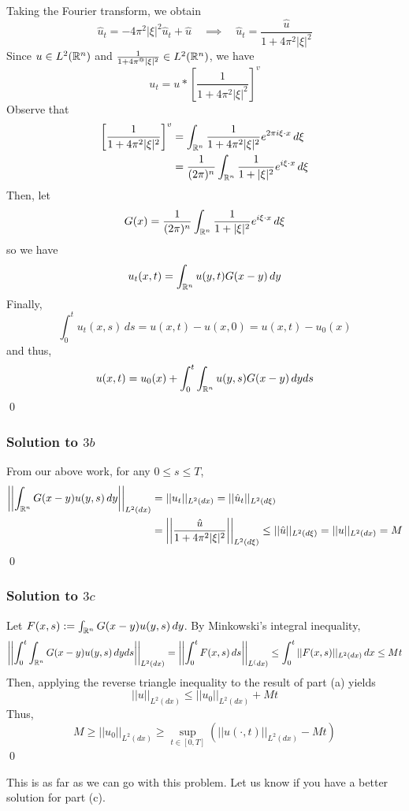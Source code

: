 Taking the Fourier transform, we obtain
$$ \hat{u}_t = -4 \pi^2 |\xi|^2 \hat{u}_t + \hat{u} \quad \implies \quad \hat{u}_t = \frac{\hat{u}}{1 + 4\pi^2|\xi|^2} $$
Since $u \in L^2(\mathbb{R}^n)$ and $\frac{1}{1+4 \pi^@ |\xi|^2} \in L^2(\mathbb{R}^n)$, we have
$$ u_t = u \ast \left[ \frac{1}{1+4 \pi^2 |\xi|^2} \right]^{v} $$
Observe that
\begin{align*}
\left[ \frac{1}{1+4 \pi^2 |\xi|^2} \right]^{v} &= \int_{\mathbb{R}^n} \frac{1}{1+4 \pi^2 |\xi|^2} e^{2 \pi i \xi \cdot x} \, d \xi \\
&= \frac{1}{(2\pi)^n} \int_{\mathbb{R}^n} \frac{1}{1+|\xi|^2} e^{i \xi \cdot x} \, d \xi
\end{align*}
Then, let
$$ G(x) = \frac{1}{(2\pi)^n} \int_{\mathbb{R}^n} \frac{1}{1+|\xi|^2} e^{i \xi \cdot x} \, d \xi $$
so we have
$$ u_t(x,t) = \int_{\mathbb{R}^n} u(y,t) G(x-y) \, dy $$
Finally,
$$ \int_0^t u_t(x,s) \, ds = u(x,t) - u(x,0) = u(x,t) - u_0(x) $$
and thus,
$$ u(x,t) = u_0(x) + \int_0^t \int_{\mathbb{R}^n} u(y,s) G(x-y) \, dy ds $$
\hfill \qed

\subsubsection*{Solution to $3b$}
From our above work, for any $0 \leq s \leq T$,
\begin{align*}
\left| \left| \int_{\mathbb{R}^n} G(x-y) u(y,s) \, dy \right| \right|_{L^2(dx)} &= ||u_t||_{L^2(dx)} = ||\hat{u}_t||_{L^2(d\xi)} \\
&= \left| \left| \frac{\hat{u}}{1 + 4\pi^2|\xi|^2} \right| \right|_{L^2(d\xi)}
\leq ||\hat{u}||_{L^2(d \xi)} = ||u||_{L^2(dx)} = M
\end{align*}
\hfill \qed

\subsubsection*{Solution to $3c$}

Let $F(x,s) := \int_{\mathbb{R}^n} G(x-y) u(y,s) \, dy$. By Minkowski's integral inequality,
$$ \left| \left| \int_0^t \int_{\mathbb{R}^n} G(x-y) u(y,s) \, dy ds \right| \right|_{L^2(dx)} = \left| \left| \int_0^t F(x,s) \, ds \right| \right|_{L^(dx)} \leq \int_0^t ||F(x,s)||_{L^2(dx)} \, dx \leq Mt $$
Then, applying the reverse triangle inequality to the result of part (a) yields
$$ ||u||_{L^2(dx)} \leq ||u_0||_{L^2(dx)} + Mt $$
Thus,
$$ M \geq ||u_0||_{L^2(dx)} \geq \sup_{t \in [0,T]} \left( ||u(\cdot, t)||_{L^2(dx)} - Mt \right) $$
\hfill \qed

\begin{rem}
This is as far as we can go with this problem. Let us know if you have a better solution for part (c).
\end{rem}



